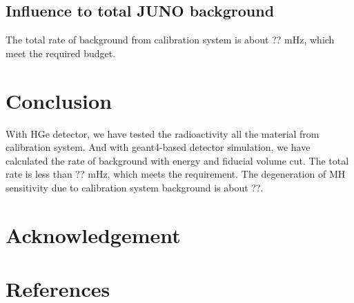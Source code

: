 \documentclass[review,number,sort&compress]{elsarticle}
\begin{document}
\subsection{Influence to total JUNO background}

The total rate of background from calibration system is about ?? mHz, which meet the required budget.

\section{Conclusion}

With HGe detector, we have tested the radioactivity all the material from calibration system.
And with geant4-based detector simulation, we have calculated the rate of background with energy and fiducial volume cut.
The total rate is less than ?? mHz, which meets the requirement.
The degeneration of MH sensitivity due to calibration system background is about ??.

\section{Acknowledgement}
\section*{References}

\end{document}
